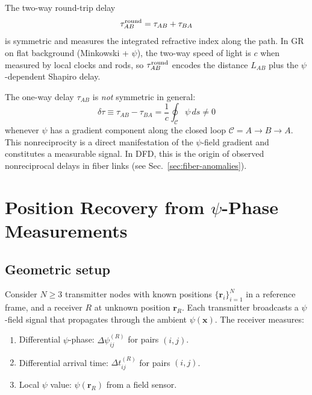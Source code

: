 \documentclass[aps,prd,twocolumn,superscriptaddress,nofootinbib]{revtex4-2}
\begin{document}
The two-way round-trip delay
\begin{equation}\label{eq:tau-round}
\tau_{AB}^{\rm round} = \tau_{AB} + \tau_{BA}
\end{equation}
is symmetric and measures the integrated refractive index along the
path. In GR on flat background (Minkowski + $\psi$), the two-way speed of
light is $c$ when measured by local clocks and rods, so
$\tau^{\rm round}_{AB}$ encodes the distance $L_{AB}$ plus the
$\psi$-dependent Shapiro delay.

The one-way delay $\tau_{AB}$ is \emph{not} symmetric in general:
\begin{equation}\label{eq:nonrecip}
\delta\tau \equiv \tau_{AB} - \tau_{BA}
= \frac{1}{c}\oint_{\mathcal{C}} \psi\,ds \neq 0
\end{equation}
whenever $\psi$ has a gradient component along the closed loop
$\mathcal{C} = A\to B\to A$. This nonreciprocity is a direct
manifestation of the $\psi$-field gradient and constitutes a measurable
signal. In DFD, this is the origin of observed nonreciprocal delays in
fiber links (see Sec.~\ref{sec:fiber-anomalies}).

\section{Position Recovery from $\psi$-Phase Measurements}\label{sec:position}

\subsection{Geometric setup}\label{sec:geometry}

Consider $N \geq 3$ transmitter nodes with known positions
$\{\mathbf{r}_i\}_{i=1}^N$ in a reference frame, and a receiver $R$
at unknown position $\mathbf{r}_R$. Each transmitter broadcasts a
$\psi$-field signal that propagates through the ambient
$\psi(\mathbf{x})$. The receiver measures:
\begin{enumerate}
\item Differential $\psi$-phase: $\Delta\psi_{ij}^{(R)}$ for pairs
$(i,j)$.
\item Differential arrival time: $\Delta t_{ij}^{(R)}$ for pairs
$(i,j)$.
\item Local $\psi$ value: $\psi(\mathbf{r}_R)$ from a field sensor.
\end{enumerate}
\end{document}
